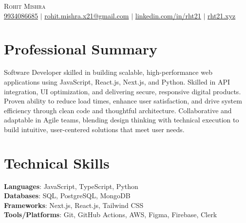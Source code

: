 \documentclass[letterpaper,11pt]{article}
\begin{document}

\begin{center}
    {\Huge \scshape Rohit Mishra} \\ \vspace{1pt}
    \vspace{5pt}
    \href{tel:+919934086685}{9934086685} $|$
    \href{mailto:rohit.mishra.x21@gmail.com}{ rohit.mishra.x21@gmail.com} $|$
    \href{https://www.linkedin.com/in/rht21/}{ linkedin.com/in/rht21} $|$
    \href{https://rht21.xyz}{ rht21.xyz}
    \vspace{-8pt}
\end{center}

\section{Professional Summary}
\small{Software Developer skilled in building scalable, high-performance web applications using JavaScript, React.js, Next.js, and Python. Skilled in API integration, UI optimization, and delivering secure, responsive digital products. Proven ability to reduce load times, enhance user satisfaction, and drive system efficiency through clean code and thoughtful architecture. Collaborative and adaptable in Agile teams, blending design thinking with technical execution to build intuitive, user-centered solutions that meet user needs.}

\vspace{-10pt}

\section{Technical Skills}
 \begin{itemize}[leftmargin=0.15in, label={}]
    {\item{
     \textbf{Languages}{: JavaScript, TypeScript, Python} \\
     \vspace{1pt}
     \textbf{Databases}{: SQL, PostgreSQL, MongoDB} \\
     \vspace{1pt}
     \textbf{Frameworks}{: Next.js, React.js, Tailwind CSS} \\
     \vspace{1pt}
     \textbf{Tools/Platforms}{: Git, GitHub Actions, AWS, Figma, Firebase, Clerk} }}
 \end{itemize}
 
\end{document}
